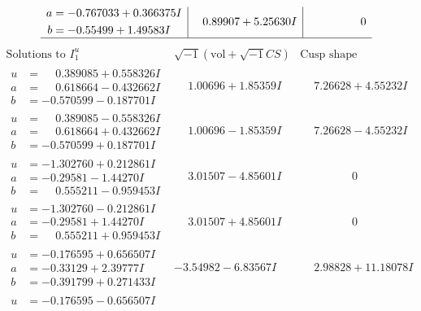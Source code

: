 \documentclass[1p]{elsarticle_modified}
\theoremstyle{definition}
\newcommand{\I}{\sqrt{-1}}
\begin{document}
$$\begin{array}{c|c|c}
\begin{aligned}
a &= -0.767033 + 0.366375 I \\
b &= -0.55499 + 1.49583 I\end{aligned}
 & \phantom{-}0.89907 + 5.25630 I & \phantom{-0.000000 } 0\\
 \hline 
 \end{array}$$\newpage$$\begin{array}{c|c|c}  
\text{Solutions to }I^u_{1}& \I (\text{vol} + \sqrt{-1}CS) & \text{Cusp shape}\\
 \hline 
\begin{aligned}
u &= \phantom{-}0.389085 + 0.558326 I \\
a &= \phantom{-}0.618664 - 0.432662 I \\
b &= -0.570599 - 0.187701 I\end{aligned}
 & \phantom{-}1.00696 + 1.85359 I & \phantom{-}7.26628 + 4.55232 I \\ \hline\begin{aligned}
u &= \phantom{-}0.389085 - 0.558326 I \\
a &= \phantom{-}0.618664 + 0.432662 I \\
b &= -0.570599 + 0.187701 I\end{aligned}
 & \phantom{-}1.00696 - 1.85359 I & \phantom{-}7.26628 - 4.55232 I \\ \hline\begin{aligned}
u &= -1.302760 + 0.212861 I \\
a &= -0.29581 - 1.44270 I \\
b &= \phantom{-}0.555211 - 0.959453 I\end{aligned}
 & \phantom{-}3.01507 - 4.85601 I & \phantom{-0.000000 } 0 \\ \hline\begin{aligned}
u &= -1.302760 - 0.212861 I \\
a &= -0.29581 + 1.44270 I \\
b &= \phantom{-}0.555211 + 0.959453 I\end{aligned}
 & \phantom{-}3.01507 + 4.85601 I & \phantom{-0.000000 } 0 \\ \hline\begin{aligned}
u &= -0.176595 + 0.656507 I \\
a &= -0.33129 + 2.39777 I \\
b &= -0.391799 + 0.271433 I\end{aligned}
 & -3.54982 - 6.83567 I & \phantom{-}2.98828 + 11.18078 I \\ \hline\begin{aligned}
u &= -0.176595 - 0.656507 I \\

\end{aligned}
\end{array}$$
\end{document}
